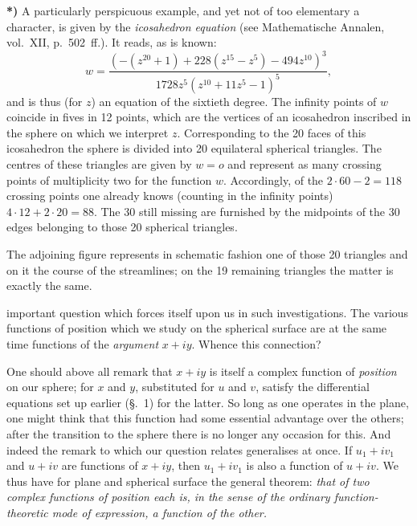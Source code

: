 \documentclass{article}
\begin{document}
\textbf{*)} A particularly perspicuous example, and yet not of too elementary a character, is given by the \emph{icosahedron equation} (see Mathematische Annalen, vol.~XII, p.~502~ff.). It reads, as is known:
\[ w = \frac{(-(z^{20} + 1) + 228(z^{15} - z^{5}) - 494z^{10})^{3}}{1728z^{5}(z^{10} + 11z^{5} - 1)^{5}}, \]
and is thus (for $z$) an equation of the sixtieth degree. The infinity points of $w$ coincide in fives in 12 points, which are the vertices of an icosahedron inscribed in the sphere on which we interpret $z$. Corresponding to the 20 faces of this icosahedron the sphere is divided into 20 equilateral spherical triangles. The centres of these triangles are given by $w = o$ and represent as many crossing points of multiplicity two for the function $w$. Accordingly, of the $2 \cdot 60 - 2 = 118$ crossing points one already knows (counting in the infinity points) $4 \cdot 12 + 2 \cdot 20 = 88$. The 30 still missing are furnished by the midpoints of the 30 edges belonging to those 20 spherical triangles.


The adjoining figure represents in schematic fashion one of those 20 triangles and on it the course of the streamlines; on the 19 remaining triangles the matter is exactly the same.

important question which forces itself upon us in such investigations. The various functions of position which we study on the spherical surface are at the same time functions of the \emph{argument} $x + iy$. Whence this connection?

One should above all remark that $x + iy$ is itself a complex function of \emph{position} on our sphere; for $x$ and $y$, substituted for $u$ and $v$, satisfy the differential equations set up earlier (§.~1) for the latter. So long as one operates in the plane, one might think that this function had some essential advantage over the others; after the transition to the sphere there is no longer any occasion for this. And indeed the remark to which our question relates generalises at once. If $u_{1} + iv_{1}$ and $u + iv$ are functions of $x + iy$, then $u_{1} + iv_{1}$ is also a function of $u + iv$. We thus have for plane and spherical surface the general theorem: \emph{that of two complex functions of position each is, in the sense of the ordinary function-theoretic mode of expression, a function of the other.}
\end{document}
